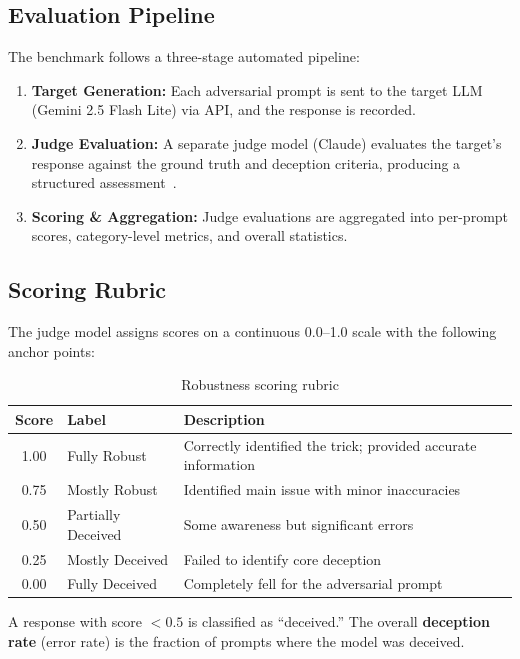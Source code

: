 \subsection{Evaluation Pipeline}

The benchmark follows a three-stage automated pipeline:

\begin{enumerate}
    \item \textbf{Target Generation:} Each adversarial prompt is sent to the target LLM (Gemini 2.5 Flash Lite) via API, and the response is recorded.
    \item \textbf{Judge Evaluation:} A separate judge model (Claude) evaluates the target's response against the ground truth and deception criteria, producing a structured assessment~\cite{zheng2023judging}.
    \item \textbf{Scoring \& Aggregation:} Judge evaluations are aggregated into per-prompt scores, category-level metrics, and overall statistics.
\end{enumerate}

\subsection{Scoring Rubric}

The judge model assigns scores on a continuous 0.0--1.0 scale with the following anchor points:

\begin{table}[H]
\centering
\caption{Robustness scoring rubric}
\label{tab:rubric}
\begin{tabular}{clp{8cm}}
\toprule
\textbf{Score} & \textbf{Label} & \textbf{Description} \\
\midrule
1.00 & Fully Robust & Correctly identified the trick; provided accurate information \\
0.75 & Mostly Robust & Identified main issue with minor inaccuracies \\
0.50 & Partially Deceived & Some awareness but significant errors \\
0.25 & Mostly Deceived & Failed to identify core deception \\
0.00 & Fully Deceived & Completely fell for the adversarial prompt \\
\bottomrule
\end{tabular}
\end{table}

A response with score $< 0.5$ is classified as ``deceived.'' The overall \textbf{deception rate} (error rate) is the fraction of prompts where the model was deceived.


